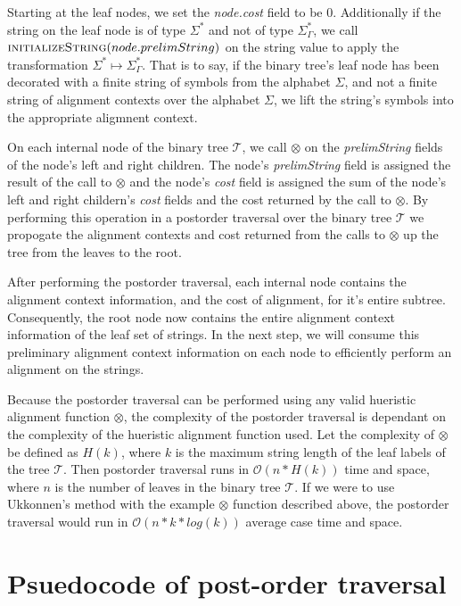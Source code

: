 \documentclass[11pt]{article}
\begin{document}
Starting at the leaf nodes, we set the \textit{node.cost} field to be $0$.
Additionally if the string on the leaf node is of type $\Sigma^{*}$ and not of type $\Sigma^{*}_{\Gamma}$, we call $\Call{initializeString}{node.prelimString}$ on the string value to apply the transformation $\Sigma^{*} \mapsto \Sigma^{*}_{\Gamma}$.
That is to say, if the binary tree's leaf node has been decorated with a finite string of symbols from the alphabet $\Sigma$, and not a finite string of alignment contexts over the alphabet $\Sigma$, we lift the string's symbols into the appropriate aligmnent context.

On each internal node of the binary tree $\mathcal{T}$, we call $\otimes$ on the \textit{prelimString} fields of the node's left and right children.
The node's \textit{prelimString} field is assigned the result of the call to $\otimes$ and the node's  \textit{cost} field is assigned the sum of the node's left and right childern's \textit{cost} fields and the cost returned by the call to $\otimes$.
By performing this operation in a postorder traversal over the binary tree $\mathcal{T}$ we propogate the alignment contexts and cost returned from the calls to $\otimes$ up the tree from the leaves to the root.

After performing the postorder traversal, each internal node contains the alignment context information, and the cost of alignment, for it's entire subtree.
Consequently, the root node now contains the entire alignment context information of the leaf set of strings.
In the next step, we will consume this preliminary alignment context information on each node to efficiently perform an alignment on the strings.

Because the postorder traversal can be performed using any valid hueristic alignment function $\otimes$, the complexity of the postorder traversal is dependant on the complexity of the hueristic alignment function used. Let the complexity of $\otimes$ be defined as $H\left(k\right)$, where $k$ is the maximum string length of the leaf labels of the tree $\mathcal{T}$. Then postorder traversal runs in $\mathcal{O}(n * H(k))$ time and space, where $n$ is the number of leaves in the binary tree $\mathcal{T}$. If we were to use Ukkonnen's method with the example $\otimes$ function described above, the postorder traversal would run in $\mathcal{O}(n * k * log (k))$ average case time and space.

\section{Psuedocode of post-order traversal}
\end{document}
